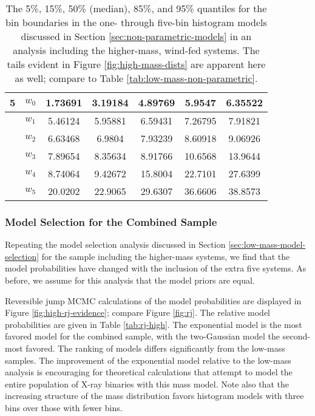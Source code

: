 \documentclass[preprint]{aastex}
\begin{document}
\begin{table}
\begin{center}
\begin{tabular}{|c|c|c|c|c|c|c|}
      \hline \hline
      5 & $w_0$ & 1.73691 & 3.19184 & 4.89769 & 5.9547 & 6.35522 \\
      \hline
      & $w_1$ & 5.46124 & 5.95881 & 6.59431 & 7.26795 & 7.91821 \\
      \hline
      & $w_2$ & 6.63468 & 6.9804 & 7.93239 & 8.60918 & 9.06926 \\
      \hline
      & $w_3$ & 7.89654 & 8.35634 & 8.91766 & 10.6568 & 13.9644 \\
      \hline
      & $w_4$ & 8.74064 & 9.42672 & 15.8004 & 22.7101 & 27.6399 \\
      \hline
      & $w_5$ & 20.0202 & 22.9065 & 29.6307 & 36.6606 & 38.8573 \\
      \hline
    \end{tabular}
  \end{center}
  \caption{\label{tab:high-mass-non-parametric} The 5\%, 15\%, 50\%
    (median), 85\%, and 95\% quantiles for the bin boundaries in the
    one- through five-bin histogram models discussed in Section
    \ref{sec:non-parametric-models} in an 
    analysis including the higher-mass, wind-fed systems.  
    The tails evident in Figure \ref{fig:high-mass-dists} are apparent
    here as well; compare to Table \ref{tab:low-mass-non-parametric}.}
\end{table}

\subsubsection{Model Selection for the Combined Sample}
\label{sec:high-mass-model-selection}

Repeating the model selection analysis discussed in Section
\ref{sec:low-mass-model-selection} for the sample including the
higher-mass systems, we find that the model probabilities have changed
with the inclusion of the extra five systems.  As before, we assume
for this analysis that the model priors are equal.

Reversible jump MCMC calculations of the model probabilities are
displayed in Figure \ref{fig:high-rj-evidence}; compare Figure
\ref{fig:rj}.  The relative model probabilities are given in Table
\ref{tab:rj-high}.  The exponential model is the most favored model
for the combined sample, with the two-Gaussian model the second-most
favored.  The ranking of models differs significantly from the
low-mass samples.  The improvement of the exponential model relative
to the low-mass analysis is encouraging for theoretical calculations
that attempt to model the entire population of X-ray binaries with
this mass model.  Note also that the increasing structure of the mass
distribution favors histogram models with three bins over those with
fewer bins.
\end{document}

